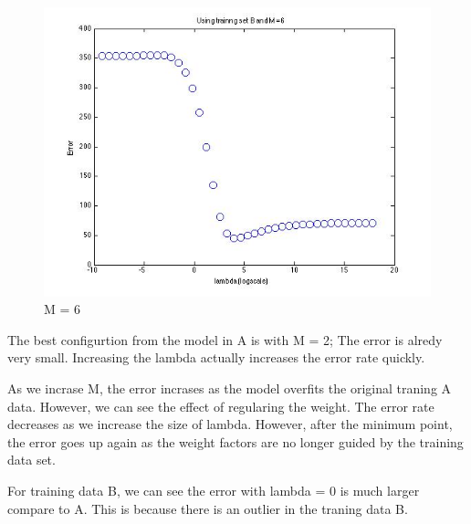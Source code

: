 \begin{figure}[!htb]
  \includegraphics[width=\linewidth]{figures/p3_regressB_m=6}
  \caption{M = 6}\label{fig:figures/p3_regressB_m=6}
\endminipage
\end{figure}


The best configurtion from the model in A is with M = 2; The error is alredy very small. Increasing
the lambda actually increases the error rate quickly. 

As we incrase M, the error incrases as the model overfits the original traning A data. However, we 
can see the effect of regularing the weight. The error rate decreases as we increase the size of lambda. However, after the minimum point, the error goes up again as the weight factors are no longer guided by the training data set. 

For training data B, we can see the error with lambda = 0 is much larger compare to A. This is because there is an outlier in the traning data B. 


